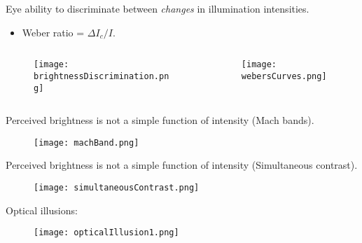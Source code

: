 \begin{frame}
Eye ability to discriminate between \textit{changes} in illumination intensities.
\begin{itemize}
\item Weber ratio = $\Delta I_{c}/I$.
\end{itemize}
\begin{columns}
\begin{column}{.5\textwidth}
\begin{figure}
\texttt{[image: brightnessDiscrimination.png]}
\end{figure}
\end{column}
\begin{column}{.5\textwidth}
\begin{figure}
\texttt{[image: webersCurves.png]}
\end{figure}
\end{column}
\end{columns}
\end{frame}


\begin{frame}
Perceived brightness is not a simple function of intensity (Mach bands).
\begin{figure}
\texttt{[image: machBand.png]}
\end{figure}
\end{frame}


\begin{frame}
Perceived brightness is not a simple function of intensity (Simultaneous contrast).
\begin{figure}
\texttt{[image: simultaneousContrast.png]}
\end{figure}
\end{frame}


\begin{frame}
Optical illusions:
\begin{figure}
\texttt{[image: opticalIllusion1.png]}
\end{figure}
\end{frame}

